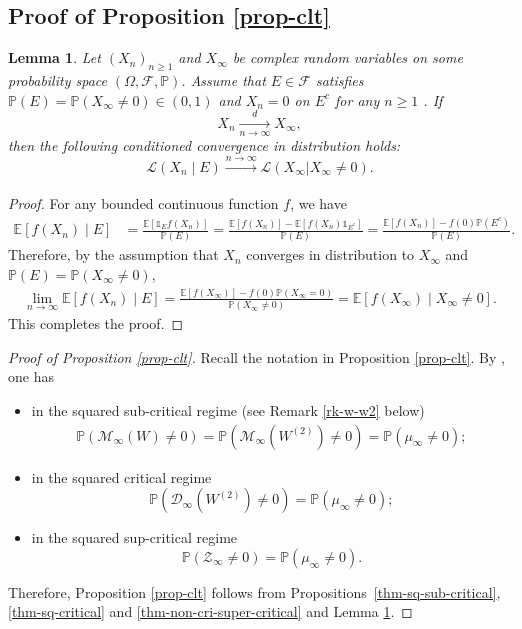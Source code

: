 \documentclass[12pt]{amsart}
\newtheorem{lemma}[theorem]{Lemma}
\theoremstyle{definition}
\theoremstyle{remark}
\newcommand{\E}{\mathbb{E}}
\newcommand{\PP}{\mathbb{P}}
\numberwithin{equation}{section}
\begin{document}
 
 
 \subsection{Proof of Proposition \ref{prop-clt}}
 
 
\begin{lemma}\label{lemma-cov-law-con-two}
Let $(X_n)_{n\geq 1}$  and $X_\infty$ be  complex random variables on some probability space $(\Omega,\mathcal{F},\PP)$. Assume that  $E\in\mathcal{F} $ satisfies $\PP(E)=\PP(X_\infty\neq 0)\in (0,1)$ and $X_n=0$ on $E^c$ for any $n\geq 1$ . 
If 
\[
X_n\xrightarrow[n\rightarrow\infty]{d} X_\infty,
\]
then the following conditioned convergence in distribution holds:
\[
\mathcal{L}(X_n\mid E)\xrightarrow[]{n\rightarrow\infty} \mathcal{L}(X_\infty|X_\infty\neq 0).
\]
\end{lemma}
\begin{proof}
For any bounded continuous function $f$, we have
\begin{align*}
\E[f(X_n)\mid E]&=\frac{\E[\mathds{1}_Ef(X_n)]}{\PP(E)}=\frac{\E[f(X_n)]-\E[f(X_n)\mathds{1}_{E^c}]}{\PP(E)} =\frac{\E[f(X_n)]-f(0)\PP(E^c)}{\PP(E)}.
\end{align*}
Therefore, by the  assumption that  $X_n$ converges in distribution to $X_\infty$ and $\PP(E)= \PP(X_\infty \ne 0)$, 
\begin{align*}
\lim_{n\rightarrow\infty}\E[f(X_n)\mid E]=\frac{\E[f(X_\infty)]-f(0) \PP(X_\infty=0)}{\PP(X_\infty\neq 0)} =\E[f(X_\infty)\mid X_\infty\neq 0].
\end{align*}
This completes the proof.
\end{proof}
 
 
 \begin{proof}[Proof of Proposition \ref{prop-clt}]
Recall the notation in Proposition \ref{prop-clt}.  By \cite[\S 3.2]{shi-zhan-book},  one has 
\begin{itemize}
\item 
in the  squared sub-critical regime  (see Remark \ref{rk-w-w2} below)
\begin{align}\label{w-w2}
\PP(\mathscr{M}_\infty(W)\neq 0)=\PP(\mathscr{M}_\infty(W^{(2)})\neq 0)=\PP(\mu_\infty\neq 0); 
\end{align}
\item  in the  squared critical regime 
\[
\PP(\mathscr{D}_\infty(W^{(2)})\neq 0)=\PP(\mu_\infty\neq 0); 
\] 
\item in the 
 squared sup-critical regime 
\[
\PP(\mathcal{Z}_\infty\neq 0)=\PP(\mu_\infty\neq 0). 
\]
\end{itemize}
Therefore, Proposition \ref{prop-clt} follows from Propositions~\ref{thm-sq-sub-critical}, \ref{thm-sq-critical} and \ref{thm-non-cri-super-critical} and Lemma \ref{lemma-cov-law-con-two}. 
\end{proof}
 
\end{document}
